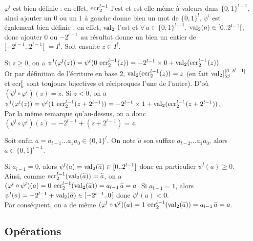 			\begin{Preuve}
				\(\varphi^l\) est bien définie : en effet, \(\operatorname{ecr}_2^{l-1}\) l'est et est elle-même à valeurs dans \(\{0,1\}^{l-1}\), ainsi ajouter un 0 ou un 1 à gauche donne bien un mot de \(\{0,1\}^l\). \nt
				\(\psi^l\) est également bien définie : en effet, \(\operatorname{val}_2\) l'est et \(\forall\,a \in \{0,1\}^{l-1}\), \(\operatorname{val}_2(a) \in [0..2^{l-1}[\), donc ajouter 0 ou \(-2^{l-1}\) au résultat donne un bien un entier de \([-2^{l-1}..2^{l-1}[ \,\,= I^l\). \nll
				Soit ensuite \(z\in{I^l}\).
					\begin{addmargin}{4mm}
						\bdot Si \(z\geq 0\), on a \(\psi^l(\varphi^l(z)) = \psi^l(0\,\operatorname{ecr}_2^{l-1}(z)) = -2^{l-1}\times 0 + \operatorname{val}_2(\operatorname{ecr}_2^{l-1}(z))\). \\
						Or par définition de l'écriture en base 2, \(\operatorname{val}_2(\operatorname{ecr}_2^{l-1}(z)) = z\) (en fait \(\operatorname{val}_2\!\big|\,\!_{\Sigma^l}^{[0..b^l-1]}\) et \(\operatorname{ecr}_b^l\) sont toujours bijectives et réciproques l'une de l'autre). D'où \((\psi^l\circ\varphi^l)(z) = z\). \nt
						\bdot Si \(z<0\), on a \(\psi^l(\varphi^l(z)) = \psi^l(1 \,\operatorname{ecr}_2^{l-1}(z+2^{l-1})) = -2^{l-1} \times 1 + \operatorname{val}_2(\operatorname{ecr}_2^{l-1}(z+2^{l-1}))\). \\
						Par la même remarque qu'au-dessus, on a donc \((\psi^l\circ\varphi^l)(z) = -2^{l-1} + (z + 2^{l-1}) = z\).
					\end{addmargin}
				
				\vs{2}
				Soit enfin \(a = a_{l-1}...a_1a_0 \in\{0,1\}^l\). On note \(\widetilde{a}\) son suffixe \(a_{l-2}...a_1a_0\), alors \(\widetilde{a}\in\{0,1\}^{l-1}\).
					\vs{-2}
					\begin{addmargin}{4mm}
						\bdot Si \(a_{l-1} = 0\), alors \(\psi^l(a) = \operatorname{val}_2(\widetilde{a}) \in [0..2^{l-1}[\) donc en particulier \(\psi^l(a) \geq 0\). \\
						Ainsi, comme \(\operatorname{ecr}_2^{l-1}(\operatorname{val}_2(\widetilde{a})) = \widetilde{a}\), on a \((\varphi^l\circ\psi^l)(a) = 0 \, \operatorname{ecr}_2^{l-1}(\operatorname{val}_2(\widetilde{a})) = a_{l-1} \, \widetilde{a} = a\). \nt
						\bdot Si \(a_{l-1} = 1\), alors \(\psi^l(a) = -2^{l-1} + \operatorname{val}_2(\widetilde{a}) \in [-2^{l-1}..0[\) donc \(\psi^l(a) < 0\). \\
						Par conséquent, on a de même \((\varphi^l\circ\psi^l)(a) = 1 \, \operatorname{ecr}_2^{l-1}(\operatorname{val}_2(\widetilde{a})) = a_{l-1} \, \widetilde{a} = a\).
					\end{addmargin}
			\end{Preuve}
		
	\subsection{Opérations}
	
